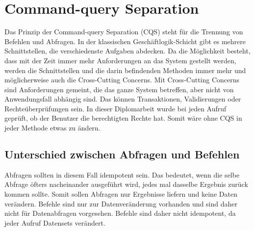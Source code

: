 \chapter{Command-query Separation}
Das Prinzip der Command-query Separation (CQS) steht für die Trennung von Befehlen und Abfragen. In der klassischen Geschäftlogik-Schicht gibt es mehrere Schnittstellen, die verschiedenste Aufgaben abdecken. Da die Möglichkeit besteht, dass  mit der Zeit immer mehr Anforderungen an das System gestellt werden, werden die Schnittstellen und die darin befindenden Methoden immer mehr und möglicherweise auch die Cross-Cutting Concerns. Mit Cross-Cutting Concerns sind Anforderungen gemeint, die das ganze System betreffen, aber nicht von Anwendungsfall abhängig sind. Das können Transaktionen, Validierungen oder Rechteüberprüfungen sein. In dieser Diplomarbeit wurde bei jeden Aufruf geprüft, ob der Benutzer die berechtigten Rechte hat. Somit wäre ohne CQS in jeder Methode etwas zu ändern. \autocite{cqsSOLIDeArchitektur}\\
\section{Unterschied zwischen Abfragen und Befehlen}
Abfragen sollten in diesem Fall idempotent sein. Das bedeutet, wenn die selbe Abfrage öfters nacheinander ausgeführt wird, jedes mal dasselbe Ergebnis zurück kommen sollte. Somit sollen Abfragen nur Ergebnisse liefern und keine Daten verändern.
Befehle sind nur zur Datenveränderung vorhanden und sind daher nicht für Datenabfragen vorgesehen. Befehle sind daher nicht idempotent, da jeder Aufruf Datensets verändert.
